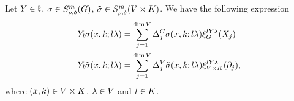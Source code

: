 \begin{lemma}
\label{lemma:Y_derivative_on_lambda_variable_of_symbols}
    Let $Y \in \LieAlgebraCompactGroup$, $\sigma \in \SymbolClass m {\rho, \delta}$, $\tilde \sigma \in \SymbolClass[\GroupDirect] m {\rho, \delta}$.
    We have the following expression
    \begin{align*}
        \LeftDifferentialOperatorFirstOrder Y_l \sigma(x, k; l \lambda)
        &= \sum_{j = 1}^{\dim \VectorSpace} \DifferenceOperator{j} \sigma(x, k; l \lambda) \Rep {l Y \lambda} (X_j)\\
        \LeftDifferentialOperatorFirstOrder Y_l \tilde \sigma(x, k; l \lambda)
        &= \sum_{j = 1}^{\dim \VectorSpace} \DifferenceOperator[\VectorSpace]{j} \tilde \sigma(x, k; l \lambda) \Rep[\GroupDirect] {l Y \lambda} (\partial_j),
    \end{align*}
    where $(x, k) \in \GroupDirect$, $\lambda \in \VectorSpace$ and $l \in \CompactGroup$.
\end{lemma}
